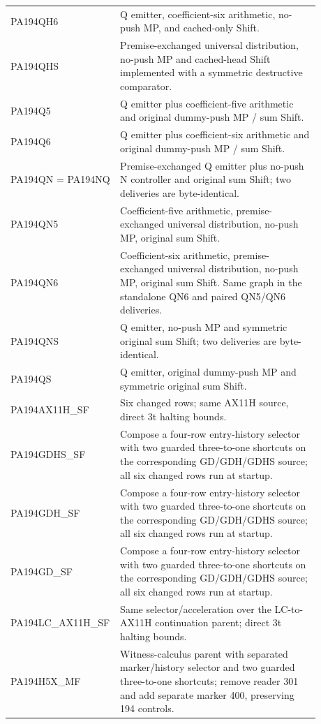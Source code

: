 \begin{longtable}{p{0.24\linewidth}p{0.64\linewidth}}
PA194QH6 & Q emitter, coefficient-six arithmetic, no-push MP, and cached-only Shift.\\[4pt]
PA194QHS & Premise-exchanged universal distribution, no-push MP and cached-head Shift implemented with a symmetric destructive comparator.\\[4pt]
PA194Q5 & Q emitter plus coefficient-five arithmetic and original dummy-push MP / sum Shift.\\[4pt]
PA194Q6 & Q emitter plus coefficient-six arithmetic and original dummy-push MP / sum Shift.\\[4pt]
PA194QN = PA194NQ & Premise-exchanged Q emitter plus no-push N controller and original sum Shift; two deliveries are byte-identical.\\[4pt]
PA194QN5 & Coefficient-five arithmetic, premise-exchanged universal distribution, no-push MP, original sum Shift.\\[4pt]
PA194QN6 & Coefficient-six arithmetic, premise-exchanged universal distribution, no-push MP, original sum Shift. Same graph in the standalone QN6 and paired QN5/QN6 deliveries.\\[4pt]
PA194QNS & Q emitter, no-push MP and symmetric original sum Shift; two deliveries are byte-identical.\\[4pt]
PA194QS & Q emitter, original dummy-push MP and symmetric original sum Shift.\\[4pt]
PA194AX11H\_SF & Six changed rows; same AX11H source, direct 3t halting bounds.\\[4pt]
PA194GDHS\_SF & Compose a four-row entry-history selector with two guarded three-to-one shortcuts on the corresponding GD/GDH/GDHS source; all six changed rows run at startup.\\[4pt]
PA194GDH\_SF & Compose a four-row entry-history selector with two guarded three-to-one shortcuts on the corresponding GD/GDH/GDHS source; all six changed rows run at startup.\\[4pt]
PA194GD\_SF & Compose a four-row entry-history selector with two guarded three-to-one shortcuts on the corresponding GD/GDH/GDHS source; all six changed rows run at startup.\\[4pt]
PA194LC\_AX11H\_SF & Same selector/acceleration over the LC-to-AX11H continuation parent; direct 3t halting bounds.\\[4pt]
PA194H5X\_MF & Witness-calculus parent with separated marker/history selector and two guarded three-to-one shortcuts; remove reader 301 and add separate marker 400, preserving 194 controls.\\[4pt]

\end{longtable}
